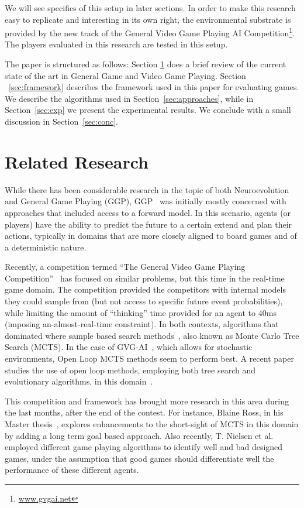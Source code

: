 \documentclass[conference]{IEEEtran}
\begin{document}
We will see specifics of this setup in later sections. In order to make this research easy to replicate and interesting in its own right, the environmental substrate is provided by the new track of the General Video Game Playing AI Competition\footnote{\url{www.gvgai.net}}. The players evaluated in this research are tested in this setup.

The paper is structured as follows: Section \ref{sec:lit} does a brief review of the current state of the art in General Game and Video Game Playing. Section ~\ref{sec:framework} describes the framework used in this paper for evaluating games. We describe the algorithms used in Section~\ref{sec:approaches}, while in Section~\ref{sec:exp} we present the experimental results. We conclude with a small discussion in Section~\ref{sec:conc}. 
 
\section{Related Research} \label{sec:lit}

While there has been considerable research in the topic of both Neuroevolution and General Game Playing (GGP), GGP~\cite{genesereth2005general} was initially mostly concerned with approaches that included access to a forward model. In this scenario, agents (or players) have the ability to predict the future to a certain extend and plan their actions, typically in domains that are more closely aligned to board games and of a deterministic nature.

Recently, a competition termed ``The General Video Game Playing Competition''~\cite{Perez2015} has focused on similar problems, but this time in the real-time game domain. The competition provided the competitors with internal models they could sample from (but not access to specific future event probabilities), while limiting the amount of ``thinking'' time provided for an agent to $40$ms (imposing an-almost-real-time constraint). In both contexts, algorithms that dominated where sample based search methods~\cite{finnsson2008simulation, Perez2015}, also known as Monte Carlo Tree Search (MCTS). In the case of GVG-AI~\cite{Perez2015}, which allows for stochastic environments, Open Loop MCTS methods seem to perform best. A recent paper studies the use of open loop methods, employing both tree search and evolutionary algorithms, in this domain~\cite{Perez2015a}.

This competition and framework has brought more research in this area during the last months, after the end of the contest. For instance, Blaine Ross, in his Master thesis~\cite{Ross2014}, explores enhancements to the short-sight of MCTS in this domain by adding a long term goal based approach. Also recently, T. Nielsen et al.~\cite{Nielsen2015} employed different game playing algorithms to identify well and bad designed games, under the assumption that good games should differentiate well the performance of these different agents.
\end{document}
